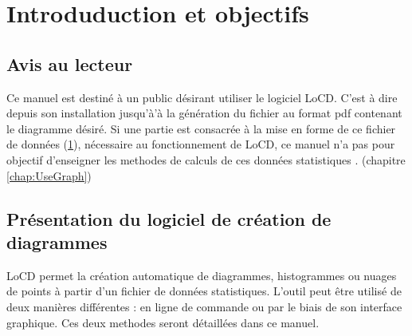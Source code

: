 \chapter{Introduduction et objectifs}\label{chap:fichDonnees}
\section{Avis au lecteur} 
Ce manuel est destiné à un public désirant utiliser le logiciel LoCD. C'est à dire depuis son installation jusqu'à'à la génération du fichier au format pdf contenant le diagramme désiré. Si une partie est consacrée à la mise en forme de ce fichier de données (\ref{chap:fichDonnees}), nécessaire au fonctionnement de LoCD, ce manuel n'a pas pour objectif d'enseigner les methodes de calculs de ces données statistiques \cite{stat}. %
(chapitre \ref{chap:UseGraph}) 
\section{Présentation du logiciel de création de diagrammes}
LoCD permet la création automatique de diagrammes, histogrammes ou nuages de points à partir d'un fichier de données statistiques.  L'outil peut être utilisé de deux manières différentes : en ligne de commande ou par le biais de son interface graphique. Ces deux methodes seront détaillées dans ce manuel. 
